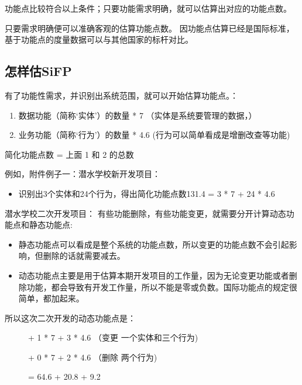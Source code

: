功能点比较符合以上条件；只要功能需求明确，就可以估算出对应的功能点数。

只要需求明确便可以准确客观的估算功能点数。
因功能点估算已经是国际标准，基于功能点的度量数据可以与其他国家的标杆对比。

\hypertarget{ux600eux6837ux4f30sifp}{%
\subsection{怎样估SiFP}\label{ux600eux6837ux4f30sifp}}

有了功能性需求，并识别出系统范围，就可以开始估算功能点。：

\begin{enumerate}
\tightlist
\item
  数据功能（简称`实体'）的数量 * 7 （实体是系统要管理的数据，）
\item
  业务功能（简称`行为'）的数量 * 4.6 (行为可以简单看成是增删改查等功能)
\end{enumerate}

\begin{description}
\tightlist
\item[]
简化功能点数 = 上面 1 和 2 的总数
\end{description}

例如，附件例子一：潜水学校新开发项目：

\begin{itemize}
\tightlist
\item
  识别出3个实体和24个行为，得出简化功能点数131.4 = 3 * 7 + 24 * 4.6
\end{itemize}

潜水学校二次开发项目：
有些功能删除，有些功能变更，就需要分开计算动态功能点和静态功能点:

\begin{itemize}
\tightlist
\item
  静态功能点可以看成是整个系统的功能点数，所以变更的功能点数不会引起影响，但删除的话就需要减去。
\item
  动态功能点主要是用于估算本期开发项目的工作量，因为无论变更功能或者删除功能，都会导致有开发工作量，所以不能是零或负数。国际功能点的规定很简单，都加起来。
\end{itemize}

所以这次二次开发的动态功能点是：

\begin{description}
\item[]

+ 1 * 7 + 3 * 4.6 （变更 一个实体和三个行为)

+ 0 * 7 + 2 * 4.6 （删除 两个行为)

= 64.6 + 20.8 + 9.2
\end{description}

